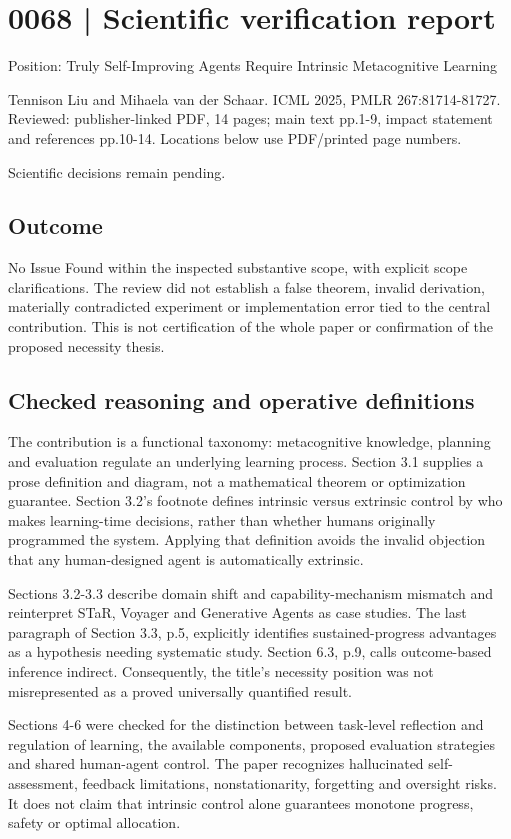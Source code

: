 \documentclass[10pt]{article}
\begin{document}
\section*{0068 | Scientific verification report}
Position: Truly Self-Improving Agents Require Intrinsic Metacognitive Learning\par
Tennison Liu and Mihaela van der Schaar. ICML 2025, PMLR 267:81714-81727. Reviewed: publisher-linked PDF, 14 pages; main text pp.1-9, impact statement and references pp.10-14. Locations below use PDF/printed page numbers.\par
Scientific decisions remain pending.\par
\subsection*{Outcome}
No Issue Found within the inspected substantive scope, with explicit scope clarifications. The review did not establish a false theorem, invalid derivation, materially contradicted experiment or implementation error tied to the central contribution. This is not certification of the whole paper or confirmation of the proposed necessity thesis.\par
\subsection*{Checked reasoning and operative definitions}
The contribution is a functional taxonomy: metacognitive knowledge, planning and evaluation regulate an underlying learning process. Section 3.1 supplies a prose definition and diagram, not a mathematical theorem or optimization guarantee. Section 3.2’s footnote defines intrinsic versus extrinsic control by who makes learning-time decisions, rather than whether humans originally programmed the system. Applying that definition avoids the invalid objection that any human-designed agent is automatically extrinsic.\par
Sections 3.2-3.3 describe domain shift and capability-mechanism mismatch and reinterpret STaR, Voyager and Generative Agents as case studies. The last paragraph of Section 3.3, p.5, explicitly identifies sustained-progress advantages as a hypothesis needing systematic study. Section 6.3, p.9, calls outcome-based inference indirect. Consequently, the title’s necessity position was not misrepresented as a proved universally quantified result.\par
Sections 4-6 were checked for the distinction between task-level reflection and regulation of learning, the available components, proposed evaluation strategies and shared human-agent control. The paper recognizes hallucinated self-assessment, feedback limitations, nonstationarity, forgetting and oversight risks. It does not claim that intrinsic control alone guarantees monotone progress, safety or optimal allocation.\par
\end{document}
